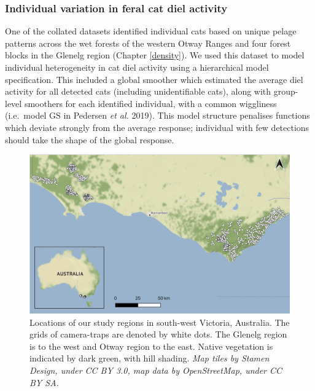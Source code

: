 \documentclass[11pt,a4paper,titlepage,twoside,openright]{style/unimelbthesis}
\begin{document}
\begin{mainmatter}
\hypertarget{individual-variation-in-feral-cat-diel-activity}{%
\subsubsection{Individual variation in feral cat diel activity}\label{individual-variation-in-feral-cat-diel-activity}}

One of the collated datasets identified individual cats based on unique pelage patterns across the wet forests of the western Otway Ranges and four forest blocks in the Glenelg region (Chapter \ref{density}). We used this dataset to model individual heterogeneity in cat diel activity using a hierarchical model specification. This included a global smoother which estimated the average diel activity for all detected cats (including unidentifiable cats), along with group-level smoothers for each identified individual, with a common wiggliness (i.e.~model GS in Pedersen \emph{et al.} 2019). This model structure penalises functions which deviate strongly from the average response; individual with few detections should take the shape of the global response.

\newpage
\begin{figure}

{\centering \includegraphics[width=1\linewidth]{figure/map_cams} 

}

\caption{Locations of our study regions in south-west Victoria, Australia. The grids of camera-traps are denoted by white dots. The Glenelg region is to the west and Otway region to the east. Native vegetation is indicated by dark green, with hill shading. \textit{Map tiles by Stamen Design, under CC BY 3.0, map data by OpenStreetMap, under CC BY SA.}}\label{fig:diel-map}
\end{figure}
\newpage


\end{mainmatter}
\end{document}
